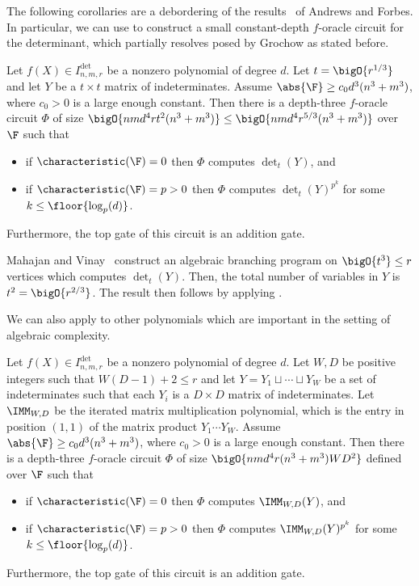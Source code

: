\documentclass[letterpaper, 11pt]{amsart}
\begin{document}
The following corollaries are a debordering of the results~\cite[Corollary 3.9, Corollary 3.10]{AF21} of Andrews and Forbes.
In particular, we can use  to construct a small constant-depth $f$-oracle circuit for the determinant, which partially resolves  posed by Grochow as stated before.
\begin{cor}\label{cor:det_oracle_for_det}
    Let $f(X) \in I^{\det}_{n, m, r}$ be a nonzero polynomial of degree $d$.
    Let $t=\bigO{r^{1/3}}$ and let $Y$ be a $t \times t$ matrix of indeterminates.
    Assume $\abs{\F} \geq c_0 d^3(n^3+m^3)$, where $c_0>0$ is a large enough constant. 
    Then there is a depth-three $f$-oracle circuit $\Phi$ of size $\bigO{n m d^4 r t^2 (n^3+m^3)} \leq \bigO{n m d^4 r^{5/3} (n^3+m^3)}$ over $\F$ such that 
    \begin{itemize}
        \item if $\characteristic(\F) = 0$ then $\Phi$ computes $\det_t(Y)$, and
        \item if $\characteristic(\F) = p > 0$ then $\Phi$ computes $\det_t(Y)^{p^k}$ for some $k \leq \floor{\log_p(d)}$.
    \end{itemize}
    Furthermore, the top gate of this circuit is an addition gate.
\end{cor}
\begin{pf}
    Mahajan and Vinay~\cite[Theorem 2]{MV97} construct an algebraic branching program on $\bigO{t^3} \leq r$ vertices which computes $\det_t(Y)$.
    Then, the total number of variables in $Y$ is $t^2 = \bigO{r^{2 / 3}}$.
    The result then follows by applying .
\end{pf}
We can also apply  to other polynomials which are important in the setting of algebraic complexity.
\begin{cor}\label{cor:det_oracle_for_IMM}
    Let $f(X) \in I^{\det}_{n, m, r}$ be a nonzero polynomial of degree $d$.
    Let $W, D$ be positive integers such that $W(D - 1) + 2 \leq r$ and let $Y = Y_1 \sqcup \cdots \sqcup Y_W$ be a set of indeterminates such that each $Y_i$ is a $D \times D$ matrix of indeterminates.
    Let $\IMM_{W, D}$ be the iterated matrix multiplication polynomial, which is the entry in position $(1, 1)$ of the matrix product $Y_1 \cdots Y_W$.
    Assume $\abs{\F} \geq c_0 d^3(n^3+m^3)$, where $c_0>0$ is a large enough constant.
    Then there is a depth-three $f$-oracle circuit $\Phi$ of size $\bigO{nmd^4 r(n^3+m^3) W D^2}$ defined over $\F$ such that 
    \begin{itemize}
        \item if $\characteristic(\F) = 0$ then $\Phi$ computes $\IMM_{W, D}(Y)$, and
        \item if $\characteristic(\F) = p > 0$ then $\Phi$ computes $\IMM_{W, D}(Y)^{p^k}$ for some $k \leq \floor{\log_p(d)}$.
    \end{itemize}
    Furthermore, the top gate of this circuit is an addition gate.
\end{cor}
\end{document}
